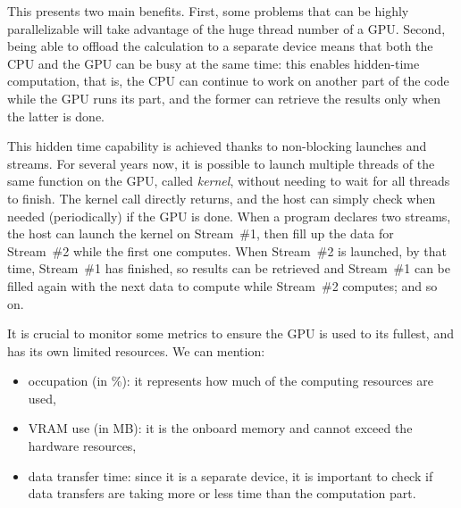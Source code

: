 This presents two main benefits. First, some problems that can be highly parallelizable will take advantage of the huge thread number of a GPU. Second, being able to offload the calculation to a separate device means that both the CPU and the GPU can be busy at the same time: this enables hidden-time computation, that is, the CPU can continue to work on another part of the code while the GPU runs its part, and the former can retrieve the results only when the latter is done.

This hidden time capability is achieved thanks to non-blocking launches and streams. For several years now, it is possible to launch multiple threads of the same function on the GPU, called \emph{kernel}, without needing to wait for all threads to finish. The kernel call directly returns, and the host can simply check when needed (periodically) if the GPU is done. When a program declares two streams, the host can launch the kernel on Stream~\#1, then fill up the data for Stream~\#2 while the first one computes. When Stream~\#2 is launched, by that time, Stream~\#1 has finished, so results can be retrieved and Stream~\#1 can be filled again with the next data to compute while Stream~\#2 computes; and so on.

It is crucial to monitor some metrics to ensure the GPU is used to its fullest, and has its own limited resources. We can mention:

\begin{itemize}
	\item occupation (in \%): it represents how much of the computing resources are used,
	\item VRAM use (in MB): it is the onboard memory and cannot exceed the hardware resources,
	\item data transfer time: since it is a separate device, it is important to check if data transfers are taking more or less time than the computation part.
\end{itemize}
